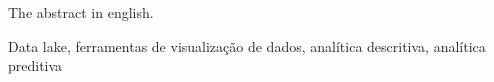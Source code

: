 
The abstract in english.

\mbox{}\linebreak
{} Data lake, ferramentas de visualização de dados, analítica descritiva, analítica preditiva


